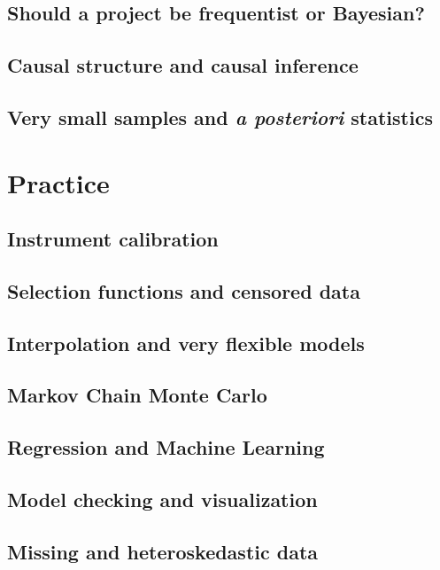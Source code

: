 \documentclass[10pt]{book}
\newcommand{\foreign}[1]{{\slshape #1}}
\begin{document}
\chapter{Should a project be frequentist or Bayesian?}

\chapter{Causal structure and causal inference}

\chapter{Very small samples and \foreign{a posteriori} statistics}

\part{Practice}

\chapter{Instrument calibration}

\chapter{Selection functions and censored data}

\chapter{Interpolation and very flexible models}

\chapter{Markov Chain Monte Carlo}

\chapter{Regression and Machine Learning}

\chapter{Model checking and visualization}

\chapter{Missing and heteroskedastic data}
\end{document}

